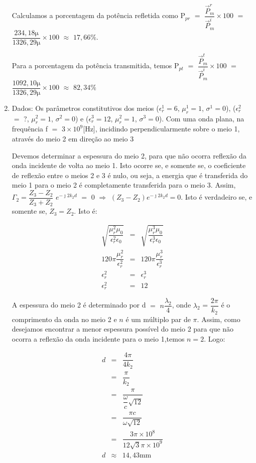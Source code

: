 \begin{enumerate}[1.]
Calculamos a porcentagem da potência refletida como P$_{pr}$ $=$ $\dfrac{\vec{P}_{m}^{r}}{\vec{P}_{m}^{i}} \times 100$ $=$ $\dfrac{234,18 \si{\micro}}{1326,29 \si{\micro}} \times 100$ $\approx$ $17,66$\%.

Para a porcentagem da potência transmitida, temos P$_{pt}$ $=$ $\dfrac{\vec{P}_{m}^{t}}{\vec{P}_{m}^{i}} \times 100$ $=$ $\dfrac{1092,10 \si{\micro}}{1326,29 \si{\micro}} \times 100$ $\approx$ $82,34$\%

\newpage

\item Dados: Os parâmetros constitutivos dos meios ($\epsilon^{1}_{r} = 6$, $\mu^{1}_{r} = 1$, $\sigma^{1} = 0$), ($\epsilon^{2}_{r}$ $=$ ?, $\mu^{2}_{r} = 1$, $\sigma^{2} = 0$) e ($\epsilon^{3}_{r} = 12$, $\mu^{2}_{r} = 1$, $\sigma^{3} = 0$). Com uma onda plana, na frequência f $=$ $3 \times 10^{9}$[\si{\hertz}], incidindo perpendicularmente sobre o meio 1, através do meio 2 em direção ao meio 3%

Devemos determinar a espessura do meio 2, para que não ocorra reflexão da onda incidente de volta ao meio 1. Isto ocorre se, e somente se, o coeficiente de reflexão entre o meios 2 e 3 é nulo, ou seja, a energia que é transferida do meio 1 para o meio 2 é completamente transferida para o meio 3. Assim, $\Gamma_{2} = \dfrac{Z_{3} - Z_{2}}{Z_{3} + Z_{2}}$ $e^{-\jmath 2k_{2}d}$ $=$ $0$ $\Rightarrow$ $(Z_{3} - Z_{2}) e^{-\jmath 2k_{2}d} = 0$. Isto é verdadeiro se, e somente se, $Z_{3} = Z_{2}$. Isto é:

\begin{eqnarray*}
\sqrt{\dfrac{\mu^{2}_{r}\mu_{0}}{\epsilon^{2}_{r}\epsilon_{0}}} & = & \sqrt{\dfrac{\mu^{3}_{r}\mu_{0}}{\epsilon^{3}_{r}\epsilon_{0}}} \\
120\pi\dfrac{\mu^{2}_{r}}{\epsilon^{2}_{r}} & = & 120\pi\dfrac{\mu^{3}_{r}}{\epsilon^{3}_{r}} \\
\epsilon^{2}_{r} & = & \epsilon^{3}_{r} \\
\epsilon^{2}_{r} & = & 12
\end{eqnarray*}

A espessura do meio 2 é determinado por d $=$ $n\dfrac{\lambda_{2}}{4}$, onde $\lambda_{2}$ = $\dfrac{2\pi}{k_{2}}$ é o comprimento da onda no meio 2 e $n$ é um múltiplo par de $\pi$. Assim, como desejamos encontrar a menor espessura possível do meio 2 para que não ocorra a reflexão da onda incidente para o meio 1,temos $n = 2$. Logo:

\begin{eqnarray*}
d & = & \dfrac{4\pi}{4k_{2}} \\
& = & \dfrac{\pi}{k_{2}} \\
& = & \dfrac{\pi}{\dfrac{\omega}{c}\sqrt{12}} \\
& = & \dfrac{\pi c}{\omega \sqrt{12}} \\
& = & \dfrac{3\pi \times 10^{8}}{12\sqrt{3}\pi \times 10^{9}} \\
d & \approx & 14,43 \si{\milli\meter}
\end{eqnarray*}



\end{enumerate}
